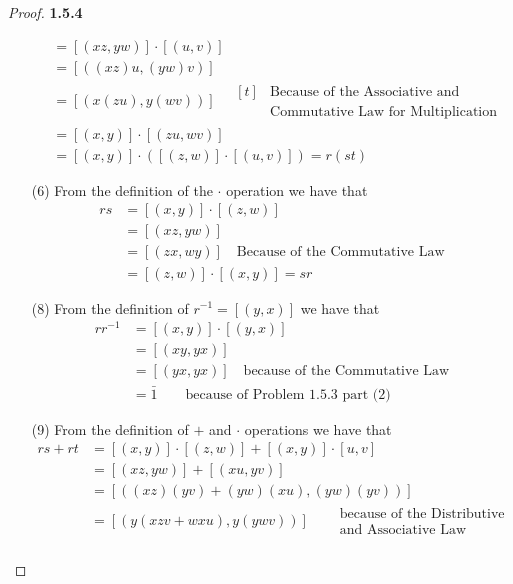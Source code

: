 \documentclass[11pt]{article}
\theoremstyle{definition}
\begin{document}
\begin{proof}{\textbf{1.5.4}}
\begin{itemize}
\begin{align*}
                &= [(xz,yw)]\cdot [(u,v)] \\
                &= [((xz)u, (yw)v)] \\
                &= [(x(zu), y(wv))] \quad \begin{aligned}[t]&\text{Because of the Associative and} \\
                                                            &\text{Commutative Law for Multiplication}\end{aligned}\\
                &= [(x, y)]\cdot[(zu, wv)]\\
                &= [(x, y)]\cdot([(z, w)]\cdot[(u,v)]) = r(st)
        \end{align*}
        \item [(6)]
        From the definition of the $\cdot$ operation we have that
        \begin{align*}
            rs &= [(x,y)]\cdot [(z,w)] \\
               &= [(xz,yw)]\\
               &= [(zx,wy)] \quad \text{Because of the Commutative Law}\\
               &= [(z,w)]\cdot[(x,y)] = sr
        \end{align*}
        \item [(8)]
        From the definition of $r^{-1} = [(y,x)]$ we have that
        \begin{align*}
            rr^{-1} &= [(x,y)] \cdot [(y,x)]\\
                &= [(xy,yx)]\\
                &= [(yx,yx)] \quad \text{because of the Commutative Law}\\
                &= \bar{1} \quad\quad \text{because of Problem 1.5.3 part (2)}
        \end{align*}
        \item [(9)]
        From the definition of $+$ and $\cdot$ operations we have that
        \begin{align*}
            rs +rt &= [(x,y)]\cdot[(z,w)] + [(x,y)]\cdot[u,v]\\
                &= [(xz,yw)] + [(xu,yv)]\\
                &= [((xz)(yv) + (yw)(xu),(yw)(yv))]\\
                &= [(y(xzv + wxu), y(ywv))]\quad \begin{aligned} &\text{because of the Distributive}\\
                                                                 &\text{and Associative Law}\end{aligned}\\

\end{align*}
\end{itemize}
\end{proof}
\end{document}
